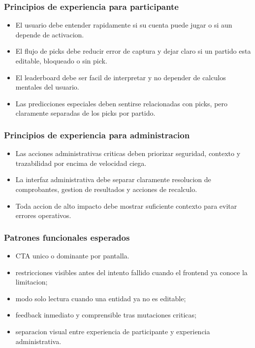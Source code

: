 \subsubsection{Principios de experiencia para participante}

\begin{itemize}
  \item El usuario debe entender rapidamente si su cuenta puede jugar o si aun depende de activacion.
  \item El flujo de picks debe reducir error de captura y dejar claro si un partido esta editable, bloqueado o sin pick.
  \item El leaderboard debe ser facil de interpretar y no depender de calculos mentales del usuario.
  \item Las predicciones especiales deben sentirse relacionadas con picks, pero claramente separadas de los picks por partido.
\end{itemize}

\subsubsection{Principios de experiencia para administracion}

\begin{itemize}
  \item Las acciones administrativas criticas deben priorizar seguridad, contexto y trazabilidad por encima de velocidad ciega.
  \item La interfaz administrativa debe separar claramente resolucion de comprobantes, gestion de resultados y acciones de recalculo.
  \item Toda accion de alto impacto debe mostrar suficiente contexto para evitar errores operativos.
\end{itemize}

\subsubsection{Patrones funcionales esperados}

\begin{itemize}
  \item CTA unico o dominante por pantalla.
  \item restricciones visibles antes del intento fallido cuando el frontend ya conoce la limitacion;
  \item modo solo lectura cuando una entidad ya no es editable;
  \item feedback inmediato y comprensible tras mutaciones criticas;
  \item separacion visual entre experiencia de participante y experiencia administrativa.
\end{itemize}

